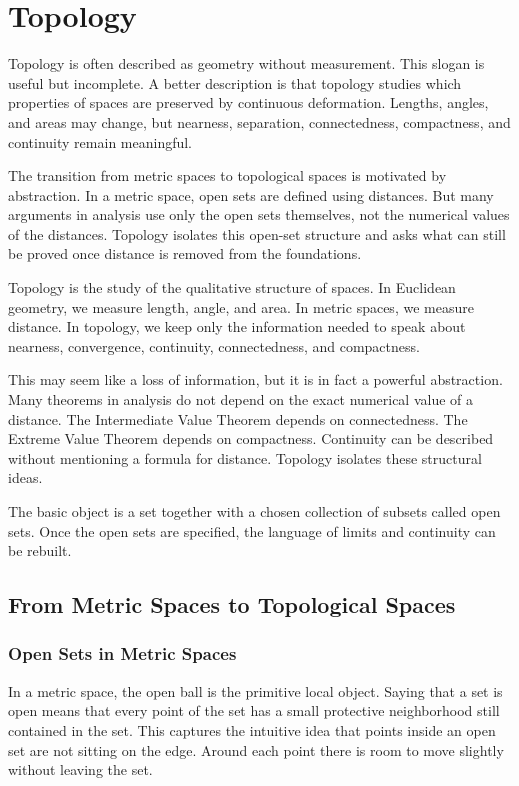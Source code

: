 \chapter{Topology}


Topology is often described as geometry without measurement. This slogan is useful but incomplete. A better description is that topology studies which properties of spaces are preserved by continuous deformation. Lengths, angles, and areas may change, but nearness, separation, connectedness, compactness, and continuity remain meaningful.

The transition from metric spaces to topological spaces is motivated by abstraction. In a metric space, open sets are defined using distances. But many arguments in analysis use only the open sets themselves, not the numerical values of the distances. Topology isolates this open-set structure and asks what can still be proved once distance is removed from the foundations.

Topology is the study of the qualitative structure of spaces. In Euclidean geometry, we measure length, angle, and area. In metric spaces, we measure distance. In topology, we keep only the information needed to speak about nearness, convergence, continuity, connectedness, and compactness.

This may seem like a loss of information, but it is in fact a powerful abstraction. Many theorems in analysis do not depend on the exact numerical value of a distance. The Intermediate Value Theorem depends on connectedness. The Extreme Value Theorem depends on compactness. Continuity can be described without mentioning a formula for distance. Topology isolates these structural ideas.

The basic object is a set together with a chosen collection of subsets called open sets. Once the open sets are specified, the language of limits and continuity can be rebuilt.

\section{From Metric Spaces to Topological Spaces}

\subsection{Open Sets in Metric Spaces}


In a metric space, the open ball is the primitive local object. Saying that a set is open means that every point of the set has a small protective neighborhood still contained in the set. This captures the intuitive idea that points inside an open set are not sitting on the edge. Around each point there is room to move slightly without leaving the set.

